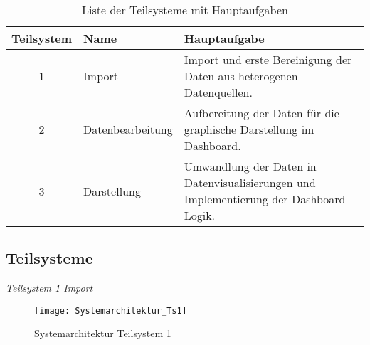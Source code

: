        \begingroup
            \setlength{\tabcolsep}{4pt} %
            \renewcommand{\arraystretch}{1.5}
            \begin{table}[H]
                \centering
                \begin{adjustbox}{max width=\textwidth}
                \LARGE
                \begin{tabular}{cll}
                   \toprule
                   \textbf{Teilsystem}             & Name   &{Hauptaufgabe} \\
                   \midrule     
                            1                      &Import  &Import und erste Bereinigung der Daten aus heterogenen Datenquellen.\\
                            2                      &Datenbearbeitung     &Aufbereitung der Daten für die graphische Darstellung im Dashboard.\\
                            3                      &Darstellung          &Umwandlung der Daten in Datenvisualisierungen und Implementierung der Dashboard-Logik.\\

                    \bottomrule
                \end{tabular}
                \end{adjustbox}
                \caption{%
                    Liste der Teilsysteme mit Hauptaufgaben
                \label{tab:Teilsysteme}
                }
                 \end{table}
            \endgroup

    \clearpage
    \subsection{Teilsysteme}
    \label{chap:five_one_three}
    
    \noindent
    \textit{Teilsystem 1 Import}\\
    \begin{figure}[H]
        \centering
            \texttt{[image: Systemarchitektur\_Ts1]}
            \caption{Systemarchitektur Teilsystem 1}
            \label{fig:Systemarchitektur Teilsystem 1}
    \end{figure}


